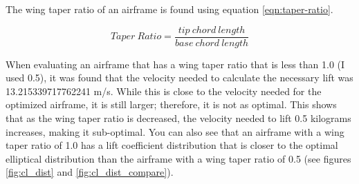 \documentclass{journal}
\begin{document}
	The wing taper ratio of an airframe is found using equation \ref{eqn:taper-ratio}.
	
	\begin{equation}
		Taper\ Ratio = \frac{tip\ chord\ length}{base\ chord\ length}
		\label{eqn:taper-ratio}
	\end{equation}
	
	When evaluating an airframe that has a wing taper ratio that is less than 1.0 (I used 0.5), it was found that the velocity needed to calculate the necessary lift was 13.215339717762241 m/s. While this is close to the velocity needed for the optimized airframe, it is still larger; therefore, it is not as optimal. This shows that as the wing taper ratio is decreased, the velocity needed to lift 0.5 kilograms increases, making it sub-optimal. You can also see that an airframe with a wing taper ratio of 1.0 has a lift coefficient distribution that is closer to the optimal elliptical distribution than the airframe with a wing taper ratio of 0.5 (see figures \ref{fig:cl_dist} and \ref{fig:cl_dist_compare}).\\
	
\end{document}

